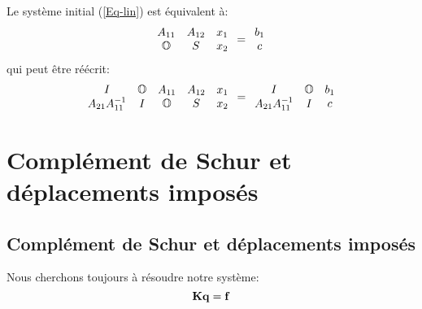 \medskipvm
Le système initial (\ref{Eq-lin}) est équivalent à:
\begin{equation}\label{Eq-Sch1}
\mathbf{\begin{array}{cc} A_{11} & A_{12}\\ \mathbb{O} & S \end{array}}
\mathbf{\begin{array}{c}x_1\\ x_2 \end{array}} =
\mathbf{\begin{array}{c} b_1\\ c \end{array}}
\end{equation}
qui peut être réécrit:
\begin{equation}
\mathbf{\begin{array}{cc} I & \mathbb{O}{} \\ A_{21}A_{11}^{-1} & I \end{array}}
\mathbf{\begin{array}{cc} A_{11} & A_{12}\\ \mathbb{O}{} & S \end{array}}
\mathbf{\begin{array}{c} x_1\\ x_2 \end{array}} =
\mathbf{\begin{array}{cc} I & \mathbb{O}{} \\ A_{21}A_{11}^{-1} & I \end{array}}
\mathbf{\begin{array}{c} b_1\\ c \end{array}}
\end{equation}

\medskip
\ifVersionAvecExemplesSepares
   \section{Complément de Schur et déplacements imposés}
\else
   \subsection{Complément de Schur et déplacements imposés}
\fi
Nous cherchons toujours à résoudre notre système:
\begin{equation}\mathbf{K}\mathbf{q}=\mathbf{f}\end{equation}

